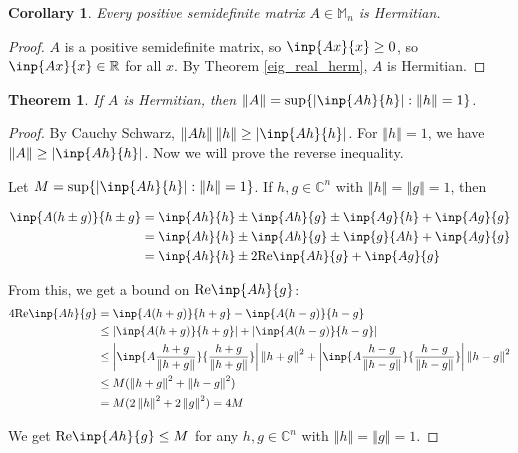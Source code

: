 \documentclass[twofold]{article}
\newcommand*\norm[1]{\left \Vert #1 \right\Vert}
\newcommand*\abs[1]{\left \vert #1 \right\vert}
\theoremstyle{plain}
\newtheorem{theorem}{Theorem}
\newtheorem*{corollary}{Corollary}
\theoremstyle{definition}
\theoremstyle{remark}
\begin{document}
\begin{corollary}Every positive semidefinite matrix \(A \in \mathbb{M}_n\) is Hermitian.\end{corollary}
\begin{proof} \(A\) is a positive semidefinite matrix, so \(\inp{Ax}{x} \ge 0 \),  so \(\inp{Ax}{x} \in \mathbb{R}\) for all \(x\). By Theorem \ref{eig_real_herm}, \(A\) is Hermitian. \end{proof}

\begin{theorem}\label{norm_herm} If \(A\) is Hermitian, then \(\norm{A} = \sup\{\abs{\inp{Ah}{h}} : \norm{h} = 1\}\).\end{theorem}
\begin{proof} By Cauchy Schwarz, \(\norm{Ah}\norm{h} \ge \abs{\inp{Ah}{h}}\). For \(\norm{h} =1\), we have  \(\norm{A} \ge \abs{\inp{Ah}{h}}\). Now we will prove the reverse inequality. 

Let \(M = \sup \{\abs{\inp{Ah}{h}} : \norm{h} = 1 \}\). If \(h, g \in \mathbb{C}^n\) with \(\norm{h} = \norm{g} = 1\), then

\begin{equation*} \begin{split}
\inp{A (h \pm g)}{h\pm g} & = \inp{Ah}{h} \pm \inp{Ah}{g} \pm \inp{Ag}{h} + \inp{Ag}{g} \\
& = \inp{Ah}{h} \pm \inp{Ah}{g} \pm \inp{g}{Ah} + \inp{Ag}{g} \\
& = \inp{Ah}{h} \pm 2 \text{Re}\inp{Ah}{g} + \inp{Ag}{g} \\
\end{split} \end{equation*}

From this, we get a bound on \(\mathrm{Re}\inp{Ah}{g}\):
\begin{equation*} \begin{split}
4\mathrm{Re} \inp{Ah}{g} &= \inp{A(h+g)}{h+g} - \inp{A(h-g)}{h-g} \\
& \le \abs{\inp{A(h+g)}{h+g}} + \abs{\inp{A(h-g)}{h-g}} \\
& \le \abs{\inp{A \frac{h+g}{\norm{h+g}}}{\frac{h+g}{\norm{h+g}}}} \norm{h + g}^2 + \abs{\inp{A \frac{h-g}{\norm{h-g}}}{\frac{h-g}{\norm{h-g}}}} \norm{h - g}^2\\
& \le M (\norm{h + g}^2 + \norm{h-g}^2) \\
& = M (2 \norm{h}^2 + 2 \norm{g}^2) = 4M 
\end{split} \end{equation*}


We get \(\text{Re} \inp{Ah}{g} \le M\) for any \(h, g \in \mathbb{C}^n\) with \(\norm{h} = \norm{g} = 1\). 


\end{proof}
\end{document}

